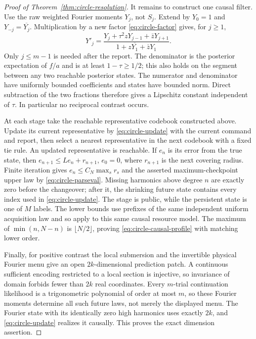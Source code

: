 \begin{proof}[Proof of Theorem~\ref{thm:circle-resolution}]
It remains to construct one causal filter. Use the raw weighted Fourier
moments $Y_j$, not $S_j$. Extend by $Y_0=1$ and
$Y_{-j}=\overline{Y_j}$. Multiplication by a new factor
\eqref{eq:circle-factor} gives, for $j\ge1$,
\begin{equation}\label{eq:circle-update}
 Y'_j=\frac{Y_j+\tau^2zY_{j-1}+\bar zY_{j+1}}
                 {1+z\overline{Y_1}+\bar zY_1}.
\end{equation}
Only $j\le m-1$ is needed after the report. The denominator is the
posterior expectation of $f/a$ and is at least $1-\tau\ge1/2$;
this also holds on the segment between any two reachable posterior
states. The numerator and denominator have uniformly bounded coefficients
and states have bounded norm. Direct subtraction of the two fractions
therefore gives a Lipschitz constant independent of $\tau$. In
particular no reciprocal contrast occurs.

At each stage take the reachable representative codebook constructed
above. Update its current representative by \eqref{eq:circle-update}
with the current command and report, then select a nearest representative
in the next codebook with a fixed tie rule. An updated representative is
reachable. If $e_n$ is its error from the true state, then
$e_{n+1}\le L e_n+r_{n+1}$, $e_0=0$, where $r_{n+1}$ is the
next covering radius. Finite iteration gives
$e_n\le C_N\max_s r_s$ and the asserted maximum-checkpoint upper
law by \eqref{eq:circle-parseval}. Missing harmonics above degree $n$
are exactly zero before the changeover; after it, the shrinking future
state contains every index used in \eqref{eq:circle-update}.
The stage is public, while the persistent state is one of $M$ labels.
The lower bounds use prefixes of the same independent uniform acquisition
law and so apply to this same causal resource model. The maximum of
$\min(n,N-n)$ is $\lfloor N/2\rfloor$, proving
\eqref{eq:circle-causal-profile} with matching lower order.

Finally, for positive contrast the local submersion and the invertible
physical Fourier menu give an open $2k$-dimensional prediction patch.
A continuous sufficient encoding restricted to a local section is
injective, so invariance of domain forbids fewer than $2k$ real
coordinates. Every $m$-trial continuation likelihood is a trigonometric polynomial
of order at most $m$, so these Fourier moments determine all such future
laws, not merely the displayed menu. The Fourier state with its identically
zero high harmonics uses exactly $2k$, and \eqref{eq:circle-update} realizes it causally.
This proves the exact dimension assertion.
\end{proof}

